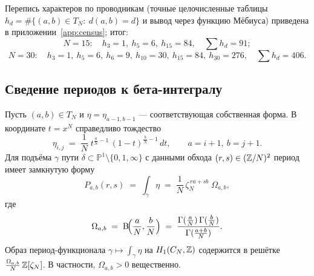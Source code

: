Перепись характеров по проводникам (точные целочисленные таблицы
$h_d=\#\{(a,b)\in T_N:\ d(a,b)=d\}$ и вывод через функцию Мёбиуса)
приведена в приложении~\ref{app:census}; итог:
\[
  N=15:\quad h_3=1,\ h_5=6,\ h_{15}=84,\quad \textstyle\sum h_d=91;
\]
\[
  N=30:\quad h_3=1,\ h_5=6,\ h_6=9,\ h_{10}=30,\ h_{15}=84,\
  h_{30}=276,\quad \textstyle\sum h_d=406.
\]

\subsection{Сведение периодов к бета-интегралу}

\begin{lemma}\label{lem:closedform}
Пусть $(a,b)\in T_N$ и $\eta=\eta_{a-1,b-1}$ --- соответствующая
собственная форма. В координате $t=x^N$ справедливо тождество
\begin{equation}\label{eq:beta}
  \eta_{i,j} \;=\; \frac{1}{N}\;
  t^{\frac{a}{N}-1}\,(1-t)^{\frac{b}{N}-1}\,dt,
  \qquad a=i+1,\ b=j+1 .
\end{equation}
Для подъёма $\gamma$ пути $\delta\subset\mathbb{P}^1\setminus
\{0,1,\infty\}$ с данными обхода $(r,s)\in(\mathbb{Z}/N)^2$ период имеет
замкнутую форму
\begin{equation}\label{eq:closedform}
  P_{a,b}(r,s) \;=\; \int_\gamma \eta
  \;=\; \frac{1}{N}\,\zeta_N^{\,ra+sb}\;\Omega_{a,b},
\end{equation}
где
\begin{equation}\label{eq:omegaab}
  \Omega_{a,b}\;=\;\mathrm{B}\!\Bigl(\frac{a}{N},\frac{b}{N}\Bigr)
  \;=\;\frac{\Gamma(\frac{a}{N})\,\Gamma(\frac{b}{N})}{\Gamma(\frac{a+b}{N})}.
\end{equation}
Образ период-функционала $\gamma\mapsto\int_\gamma\eta$ на
$H_1(C_N,\mathbb{Z})$ содержится в решётке
$\frac{\Omega_{a,b}}{N}\,\mathbb{Z}[\zeta_N]$. В частности, $\Omega_{a,b}>0$
вещественно.
\end{lemma}

